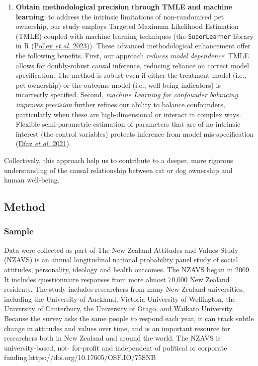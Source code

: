 \documentclass[
  singlecolumn,
  9pt]{article}
\begin{document}
\begin{enumerate}
\item
  \textbf{Obtain methodological precision through TMLE and machine
  learning}: to address the intrinsic limitations of non-randomised pet
  ownership, our study employs Targeted Maximum Likelihood Estimation
  (TMLE) coupled with machine learning techniques (the
  \texttt{SuperLearner} library in R (\hyperref[ref-polley2023]{Polley
  \emph{et al.} 2023})). These advanced methodological enhancement offer
  the following benefits. First, our approach \emph{reduces model
  dependence}: TMLE allows for doubly-robust causal inference, reducing
  reliance on correct model specification. The method is robust even if
  either the treatment model (i.e., pet ownership) or the outcome model
  (i.e., well-being indicators) is incorrectly specified. Second,
  \emph{machine Learning for confounder balancing improves precision}
  further refines our ability to balance confounders, particularly when
  these are high-dimensional or interact in complex ways. Flexible
  semi-parametric estimation of parameters that are of no intrinsic
  interest (the control variables) protects inference from model
  mis-specification (\hyperref[ref-duxedaz2021]{Díaz \emph{et al.}
  2021}).
\end{enumerate}

Collectively, this approach help us to contribute to a deeper, more
rigorous understanding of the causal relationship between cat or dog
ownership and human well-being.

\subsection{Method}\label{method}

\subsubsection{Sample}\label{sample}

Data were collected as part of The New Zealand Attitudes and Values
Study (NZAVS) is an annual longitudinal national probability panel study
of social attitudes, personality, ideology and health outcomes. The
NZAVS began in 2009. It includes questionnaire responses from more
almost 70,000 New Zealand residents. The study includes researchers from
many New Zealand universities, including the University of Auckland,
Victoria University of Wellington, the University of Canterbury, the
University of Otago, and Waikato University. Because the survey asks the
same people to respond each year, it can track subtle change in
attitudes and values over time, and is an important resource for
researchers both in New Zealand and around the world. The NZAVS is
university-based, not- for-profit and independent of political or
corporate funding.https://doi.org/10.17605/OSF.IO/75SNB
\end{document}
